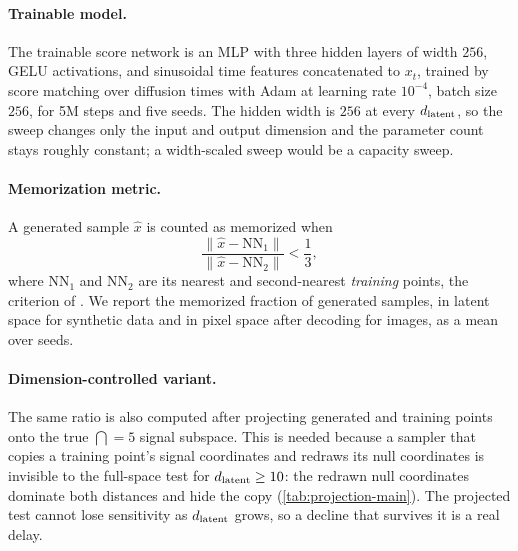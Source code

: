 \paragraph{Trainable model.}
The trainable score network is an MLP with three hidden layers of width $256$, GELU activations, and sinusoidal time features concatenated to $x_t$, trained by score matching over diffusion times with Adam at learning rate $10^{-4}$, batch size $256$, for 5M steps and five seeds. The hidden width is $256$ at every $d_{\mathrm{latent}}$, so the sweep changes only the input and output dimension and the parameter count stays roughly constant; a width-scaled sweep would be a capacity sweep.

\paragraph{Memorization metric.}
A generated sample $\hat x$ is counted as memorized when
\begin{equation*}
  \frac{\|\hat x-\mathrm{NN}_1\|}{\|\hat x-\mathrm{NN}_2\|}<\frac{1}{3},
\end{equation*}
where $\mathrm{NN}_1$ and $\mathrm{NN}_2$ are its nearest and second-nearest \emph{training} points, the criterion of \citet{bonnaire2025} . We report the memorized fraction of generated samples, in latent space for synthetic data and in pixel space after decoding for images, as a mean over seeds.

\paragraph{Dimension-controlled variant.}
The same ratio is also computed after projecting generated and training points onto the true $\dint=5$ signal subspace. This is needed because a sampler that copies a training point's signal coordinates and redraws its null coordinates is invisible to the full-space test for $d_{\mathrm{latent}}\ge10$: the redrawn null coordinates dominate both distances and hide the copy (\cref{tab:projection-main}). The projected test cannot lose sensitivity as $d_{\mathrm{latent}}$ grows, so a decline that survives it is a real delay.

